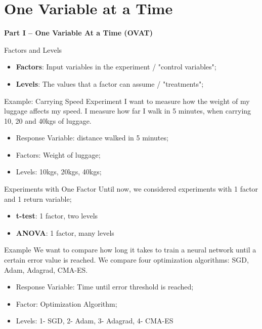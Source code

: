 \section{One Variable at a Time}
\begin{frame}
  \begin{center}
    {\bf Part I -- One Variable At a Time (OVAT)}
  \end{center}
\end{frame}

\begin{frame}{Factors and Levels}
  \begin{itemize}
    \item {\bf Factors}: Input variables in the experiment / "control variables";
    \item {\bf Levels}: The values that a factor can assume / "treatments";
  \end{itemize}

  \begin{block}{Example: Carrying Speed Experiment}
    I want to measure how the weight of my luggage affects my speed. I measure
    how far I walk in 5 minutes, when carrying 10, 20 and 40kgs of luggage.\bigskip

    \begin{itemize}
      \item Response Variable: distance walked in 5 minutes;
      \item Factors: Weight of luggage;
      \item Levels: 10kgs, 20kgs, 40kgs;
    \end{itemize}
  \end{block}
\end{frame}


\begin{frame}{Experiments with One Factor}
  Until now, we considered experiments with 1 factor and 1 return variable;
  \begin{itemize}
    \item {\bf t-test}: 1 factor, two levels
    \item {\bf ANOVA}: 1 factor, many levels
  \end{itemize}

  \begin{block}{Example}
    We want to compare how long it takes to train a neural network until a certain
    error value is reached. We compare four optimization algorithms: SGD, Adam, Adagrad, CMA-ES.

    \begin{itemize}
      \item Response Variable: Time until error threshold is reached;
      \item Factor: Optimization Algorithm;
      \item Levels: 1- SGD, 2- Adam, 3- Adagrad, 4- CMA-ES
    \end{itemize}
  \end{block}
\end{frame}

